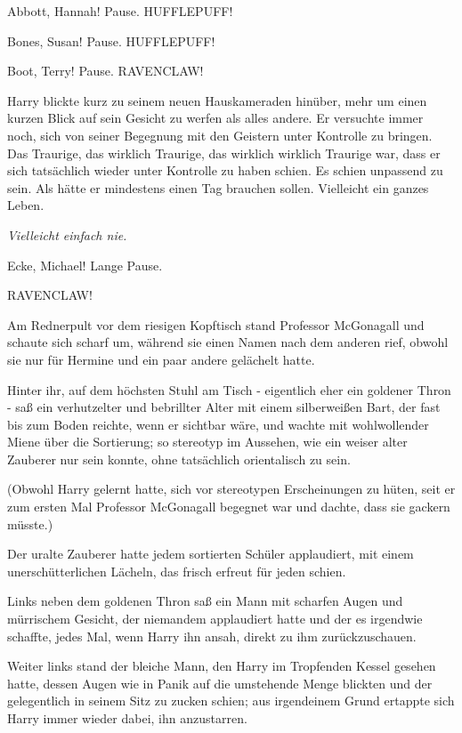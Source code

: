 
\loq Abbott, Hannah!\grqq{} Pause. \glqq{}HUFFLEPUFF!\grqq{}

\glqq{}Bones, Susan!\grqq{} Pause. \glqq{}HUFFLEPUFF!\grqq{}

\glqq{}Boot, Terry!\grqq{} Pause. \glqq{}RAVENCLAW!\grqq{}

Harry blickte kurz zu seinem neuen Hauskameraden hinüber, mehr um einen kurzen
Blick auf sein Gesicht zu werfen als alles andere. Er versuchte immer noch, sich
von seiner Begegnung mit den Geistern unter Kontrolle zu bringen. Das Traurige,
das wirklich Traurige, das wirklich wirklich Traurige war, dass er sich
tatsächlich wieder unter Kontrolle zu haben schien. Es schien unpassend zu sein.
Als hätte er mindestens einen Tag brauchen sollen. Vielleicht ein ganzes Leben.

\emph{Vielleicht einfach nie.}

\glqq{}Ecke, Michael!\grqq{} Lange Pause.

\glqq{}RAVENCLAW!\grqq{}

Am Rednerpult vor dem riesigen Kopftisch stand Professor McGonagall und schaute
sich scharf um, während sie einen Namen nach dem anderen rief, obwohl sie nur
für Hermine und ein paar andere gelächelt hatte.

Hinter ihr, auf dem höchsten Stuhl am Tisch - eigentlich eher ein goldener Thron
- saß ein verhutzelter und bebrillter Alter mit einem silberweißen Bart, der
fast bis zum Boden reichte, wenn er sichtbar wäre, und wachte mit wohlwollender
Miene über die Sortierung; so stereotyp im Aussehen, wie ein weiser alter
Zauberer nur sein konnte, ohne tatsächlich orientalisch zu sein.

(Obwohl Harry gelernt hatte, sich vor stereotypen Erscheinungen zu hüten, seit
er zum ersten Mal Professor McGonagall begegnet war und dachte, dass sie gackern
müsste.)

Der uralte Zauberer hatte jedem sortierten Schüler applaudiert, mit einem
unerschütterlichen Lächeln, das frisch erfreut für jeden schien.

Links neben dem goldenen Thron saß ein Mann mit scharfen Augen und mürrischem
Gesicht, der niemandem applaudiert hatte und der es irgendwie schaffte, jedes
Mal, wenn Harry ihn ansah, direkt zu ihm zurückzuschauen.

Weiter links stand der bleiche Mann, den Harry im Tropfenden Kessel gesehen
hatte, dessen Augen wie in Panik auf die umstehende Menge blickten und der
gelegentlich in seinem Sitz zu zucken schien; aus irgendeinem Grund ertappte
sich Harry immer wieder dabei, ihn anzustarren.

